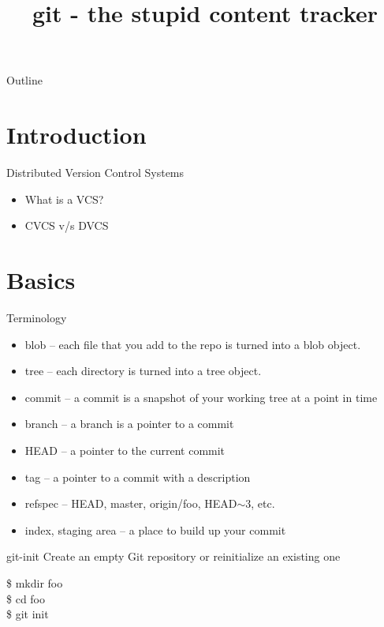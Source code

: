 \documentclass{beamer}
\title{git - the stupid content tracker}
\begin{document}
\begin{frame}
  \titlepage
\end{frame}

\begin{frame}{Outline}
  \tableofcontents
\end{frame}

\section{Introduction}

\begin{frame}{Distributed Version Control Systems}
  \begin{itemize}
  \item What is a VCS?
  \item CVCS v/s DVCS
  \end{itemize}
\end{frame}

\section{Basics}

\begin{frame}{Terminology}
  \begin{itemize}
  \item blob -- each file that you add to the repo is turned into a blob object.
  \item tree -- each directory is turned into a tree object.
  \item commit -- a commit is a snapshot of your working tree at a point in time
  \item branch -- a branch is a pointer to a commit
  \item HEAD -- a pointer to the current commit
  \item tag -- a pointer to a commit with a description
  \item refspec -- HEAD, master, origin/foo, HEAD$\sim$3, etc.
  \item index, staging area -- a place to build up your commit
  \end{itemize}
\end{frame}

\begin{frame}{git-init}
  Create an empty Git repository or reinitialize an existing one
  \begin{Example}
    \$ mkdir foo \\
    \$ cd foo \\
    \$ git init
  \end{Example}
\end{frame}
\end{document}
